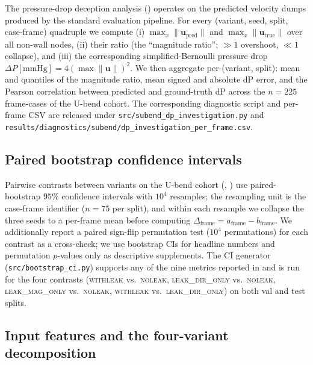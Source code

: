 \documentclass[10pt,a4paper]{article}
\newcommand{\withleak}{\textsc{withleak}}
\newcommand{\dironly}{\textsc{leak\_dir\_only}}
\newcommand{\magonly}{\textsc{leak\_mag\_only}}
\newcommand{\noleak}{\textsc{noleak}}
\begin{document}
The pressure-drop deception analysis ()
operates on the predicted velocity dumps produced by the standard
evaluation pipeline. For every (variant, seed, split, case-frame)
quadruple we compute (i) $\max_x\|\mathbf{u}_\mathrm{pred}\|$ and
$\max_x\|\mathbf{u}_\mathrm{true}\|$ over all non-wall nodes, (ii)
their ratio (the ``magnitude ratio''; $\gg\!1$ overshoot,
$\ll\!1$ collapse), and (iii) the corresponding simplified-Bernoulli
pressure drop $\Delta P[\mathrm{mmHg}] = 4 (\max\|\mathbf{u}\|)^{2}$.
We then aggregate per-(variant, split): mean and quantiles of the
magnitude ratio, mean signed and absolute dP error, and the
Pearson correlation between predicted and ground-truth dP across the
$n\!=\!225$ frame-cases of the U-bend cohort. The corresponding
diagnostic script and per-frame CSV are released under
\texttt{src/subend\_dp\_investigation.py} and
\texttt{results/diagnostics/subend/dp\_investigation\_per\_frame.csv}.

\subsection*{Paired bootstrap confidence intervals}
\label{sec:methods_bootstrap}

Pairwise contrasts between variants on the U-bend cohort
(, ) use paired-bootstrap
$95\%$ confidence intervals with $10^{4}$ resamples; the resampling
unit is the case-frame identifier ($n\!=\!75$ per split), and within
each resample we collapse the three seeds to a per-frame mean before
computing $\Delta_\mathrm{frame} = a_\mathrm{frame} - b_\mathrm{frame}$.
We additionally report a paired sign-flip permutation test
($10^{4}$ permutations) for each contrast as a cross-check; we use
bootstrap CIs for headline numbers and permutation $p$-values only
as descriptive supplements. The CI generator
(\texttt{src/bootstrap\_ci.py}) supports any of the nine metrics
reported in  and is run for the
four contrasts (\withleak{} vs.\ \noleak{}, \dironly{} vs.\ \noleak{},
\magonly{} vs.\ \noleak{}, \withleak{} vs.\ \dironly{}) on both
val and test splits.

\subsection*{Input features and the four-variant decomposition}
\end{document}
